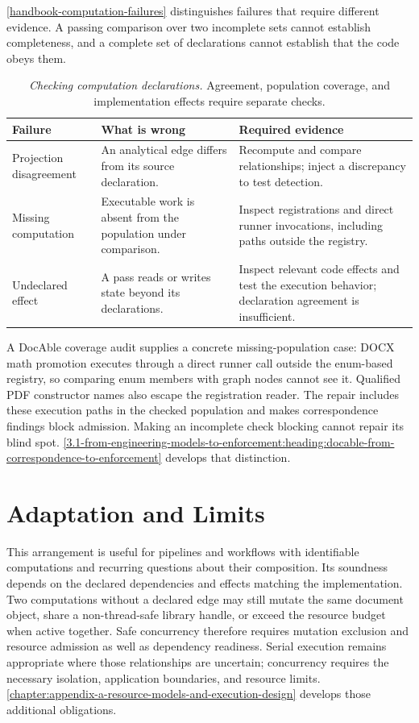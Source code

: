 \autoref{handbook-computation-failures} distinguishes failures that require different evidence. A passing comparison over two incomplete sets cannot establish completeness, and a complete set of declarations cannot establish that the code obeys them.

{\footnotesize
\begin{longtable}{@{}p{.23\linewidth}p{.37\linewidth}p{.32\linewidth}@{}}
\caption[Checking computation declarations]{\emph{Checking computation declarations.} Agreement, population coverage, and implementation effects require separate checks.}\label{handbook-computation-failures}\\
\toprule
\textbf{Failure} & \textbf{What is wrong} & \textbf{Required evidence} \\
\midrule\endhead
Projection disagreement & An analytical edge differs from its source declaration. & Recompute and compare relationships; inject a discrepancy to test detection. \\
Missing computation & Executable work is absent from the population under comparison. & Inspect registrations and direct runner invocations, including paths outside the registry. \\
Undeclared effect & A pass reads or writes state beyond its declarations. & Inspect relevant code effects and test the execution behavior; declaration agreement is insufficient. \\
\bottomrule
\end{longtable}
}

A DocAble coverage audit supplies a concrete missing-population case: DOCX math promotion executes through a direct runner call outside the enum-based registry, so comparing enum members with graph nodes cannot see it. Qualified PDF constructor names also escape the registration reader. The repair includes these execution paths in the checked population and makes correspondence findings block admission. Making an incomplete check blocking cannot repair its blind spot. \autoref{3.1-from-engineering-models-to-enforcement:heading:docable-from-correspondence-to-enforcement} develops that distinction.

\section{Adaptation and Limits}

This arrangement is useful for pipelines and workflows with identifiable computations and recurring questions about their composition. Its soundness depends on the declared dependencies and effects matching the implementation. Two computations without a declared edge may still mutate the same document object, share a non-thread-safe library handle, or exceed the resource budget when active together. Safe concurrency therefore requires mutation exclusion and resource admission as well as dependency readiness. Serial execution remains appropriate where those relationships are uncertain; concurrency requires the necessary isolation, application boundaries, and resource limits. \autoref{chapter:appendix-a-resource-models-and-execution-design} develops those additional obligations.
